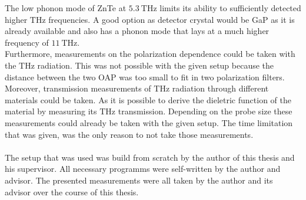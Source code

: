 The low phonon mode of ZnTe at $\SI{5.3}{\tera\hertz}$ limits its ability to sufficiently detected higher $\si{\tera\hertz}$ frequencies.
A good option as detector crystal would be GaP as it is already available and also has a phonon mode that lays at a much higher frequency of $\SI{11}{\tera\hertz}$.
\\
Furthermore, measurements on the polarization dependence could be taken with the $\si{\tera\hertz}$ radiation.
This was not possible with the given setup because the distance between the two OAP was too small to fit in two polarization filters.
Moreover, transmission measurements of $\si{\tera\hertz}$ radiation through different materials could be taken.
As it is possible to derive the dieletric function of the material by measuring its $\si{\tera\hertz}$ transmission.
Depending on the probe size these measurements could already be taken with the given setup.
The time limitation that was given, was the only reason to not take those measurements.
\\\\
The setup that was used was build from scratch by the author of this thesis and his supervisor.
All necessary programms were self-written by the author and advisor.
The presented measurements were all taken by the author and its advisor over the course of this thesis.